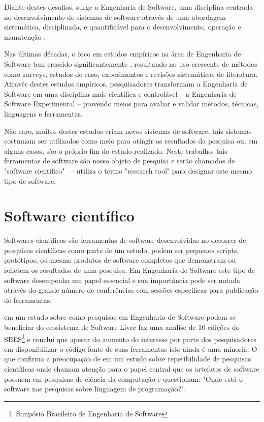 \documentclass[qual, classic, a4paper]{ufbathesis}
\begin{document}
Diante destes desafios, surge a Engenharia de Software, uma disciplina
centrada no desenvolvimento de sistemas de software através
de uma abordagem sistemática, disciplinada, e quantificável para o
desenvolvimento, operação e manutenção \cite{SWEBOK2014}.

Nas últimas décadas, o foco em estudos empíricos na área de Engenharia de
Software tem crescido significantemente \cite{Stol2015}, resultando no uso
crescente de métodos como surveys, estudos de caso, experimentos e revisões
sistemáticas de literatura. Através destes estudos empíricos, pesquisadores
transformam a Engenharia de Software em uma disciplina mais científica e
controlável -- a  Engenharia de Software Experimental -- provendo meios para
avaliar e validar métodos, técnicas, linguagens e ferramentas.

Não raro, muitos destes estudos criam novos sistemas de software, tais
sistemas costumam ser utilizados como meio para atingir os resultados da
pesquisa ou, em alguns casos, são o próprio fim do estudo realizado. Neste
trabalho, tais ferramentas de software são nosso objeto de pesquisa e serão
chamados de "software científico" \ --  utiliza o termo
"research tool" para designar este mesmo tipo de software.

\section{Software científico}

Softwares científicos são ferramentas de software desenvolvidas no decorrer de
pesquisas científicas como parte de um estudo, podem ser pequenos scripts,
protótipos, ou mesmo produtos de software completos que demonstram ou refletem
os resultados de uma pesquisa. Em Engenharia de Software este tipo de software
desempenha um papel essencial e sua importância pode ser notada através do
grande número de conferências com sessões específicas para publicação de
ferramentas.

 em um estudo sobre como pesquisas em Engenharia de
Software podem se beneficiar do ecosistema de Software Livre faz uma análise
de 10 edições do SBES\footnote{Simpósio Brasileiro de Engenharia de Software}
e conclui que apesar do aumento do interesse por parte dos pesquisadores em
disponibilizar o código-fonte de suas ferramentas isto ainda é uma minoria. O
que confirma a preocupação de  em um estudo
sobre repetibilidade de pesquisas científicas onde chamam atenção para o papel
central que os artefatos de software possuem em pesquisas de ciência da
computação e questionam: "Onde está o software nas pesquisas sobre linguagem
de programação?".
\end{document}
